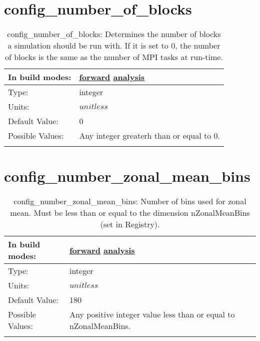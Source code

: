\section[config\_number\_of\_blocks]{config\_number\_of\_blocks}
\label{sec:nm_sec_config_number_of_blocks}
\begin{center}
\begin{longtable}{| p{2.0in} || p{4.0in} |}
    \hline
    In build modes: & \hyperref[subsec:forward_nm_tab_decomposition]{forward} \hyperref[subsec:analysis_nm_tab_decomposition]{analysis} \\
    \hline
    Type: & integer \\
    \hline
    Units: & $unitless$ \\
    \hline
    Default Value: & 0 \\
    \hline
    Possible Values: & Any integer greaterh than or equal to 0. \\
    \hline
    \caption{config\_number\_of\_blocks: Determines the number of blocks a simulation should be run with. If it is set to 0, the number of blocks is the same as the number of MPI tasks at run-time.}
\end{longtable}
\end{center}
\section[config\_number\_zonal\_mean\_bins]{config\_number\_zonal\_mean\_bins}
\label{sec:nm_sec_config_number_zonal_mean_bins}
\begin{center}
\begin{longtable}{| p{2.0in} || p{4.0in} |}
    \hline
    In build modes: & \hyperref[subsec:forward_nm_tab_zonal_mean]{forward} \hyperref[subsec:analysis_nm_tab_zonal_mean]{analysis} \\
    \hline
    Type: & integer \\
    \hline
    Units: & $unitless$ \\
    \hline
    Default Value: & 180 \\
    \hline
    Possible Values: & Any positive integer value less than or equal to nZonalMeanBins. \\
    \hline
    \caption{config\_number\_zonal\_mean\_bins: Number of bins used for zonal mean.  Must be less than or equal to the dimension nZonalMeanBins (set in Registry).}
\end{longtable}
\end{center}
